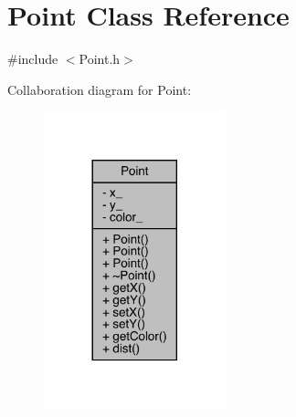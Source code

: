 \hypertarget{class_point}{}\section{Point Class Reference}
\label{class_point}


{\ttfamily \#include $<$Point.\+h$>$}



Collaboration diagram for Point\+:
\nopagebreak
\begin{figure}[H]
\begin{center}
\leavevmode
\includegraphics[width=149pt]{class_point__coll__graph}
\end{center}
\end{figure}
